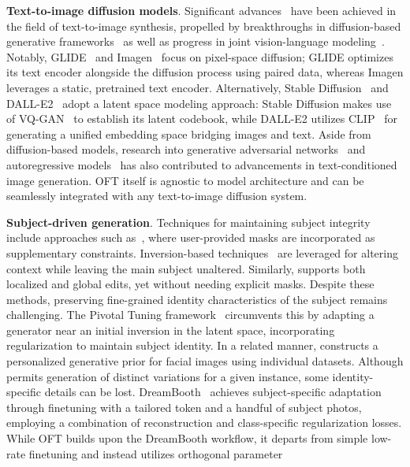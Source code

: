 \textbf{Text-to-image diffusion models}. Significant advances~\cite{saharia2022photorealistic,ramesh2022hierarchical,rombach2022high,gu2022vector,nichol2022glide} have been achieved in the field of text-to-image synthesis, propelled by breakthroughs in diffusion-based generative frameworks~\cite{ho2020denoising,song2021score,song2021denoising,dhariwal2021diffusion} as well as progress in joint vision-language modeling~\cite{su2020vlbert,lu2019vilbert,radford2021learning,wang2021simvlm,li2022blip,li2023blip,alayrac2022flamingo,schuhmann2022laion}. Notably, GLIDE~\cite{nichol2022glide} and Imagen~\cite{saharia2022photorealistic} focus on pixel-space diffusion; GLIDE optimizes its text encoder alongside the diffusion process using paired data, whereas Imagen leverages a static, pretrained text encoder. Alternatively, Stable Diffusion~\cite{rombach2022high} and DALL-E2~\cite{ramesh2022hierarchical} adopt a latent space modeling approach: Stable Diffusion makes use of VQ-GAN~\cite{esser2021taming} to establish its latent codebook, while DALL-E2 utilizes CLIP~\cite{radford2021learning} for generating a unified embedding space bridging images and text. Aside from diffusion-based models, research into generative adversarial networks~\cite{reed2016generative,zhang2017stackgan,xu2018attngan,li2019controllable} and autoregressive models~\cite{ramesh2021zero,ding2021cogview,wu2022nuwa,yuscaling} has also contributed to advancements in text-conditioned image generation. OFT itself is agnostic to model architecture and can be seamlessly integrated with any text-to-image diffusion system.

\textbf{Subject-driven generation}. Techniques for maintaining subject integrity include approaches such as~\cite{avrahami2022blended,nichol2022glide}, where user-provided masks are incorporated as supplementary constraints. Inversion-based techniques~\cite{choi2021ilvr,dhariwal2021diffusion,ramesh2022hierarchical,gal2022image} are leveraged for altering context while leaving the main subject unaltered. Similarly, \cite{hertz2022prompt} supports both localized and global edits, yet without needing explicit masks. Despite these methods, preserving fine-grained identity characteristics of the subject remains challenging. The Pivotal Tuning framework~\cite{roich2022pivotal} circumvents this by adapting a generator near an initial inversion in the latent space, incorporating regularization to maintain subject identity. In a related manner, \cite{nitzan2022mystyle} constructs a personalized generative prior for facial images using individual datasets. Although \cite{casanova2021instance} permits generation of distinct variations for a given instance, some identity-specific details can be lost. DreamBooth~\cite{ruiz2023dreambooth} achieves subject-specific adaptation through finetuning with a tailored token and a handful of subject photos, employing a combination of reconstruction and class-specific regularization losses. While OFT builds upon the DreamBooth workflow, it departs from simple low-rate finetuning and instead utilizes orthogonal parameter

